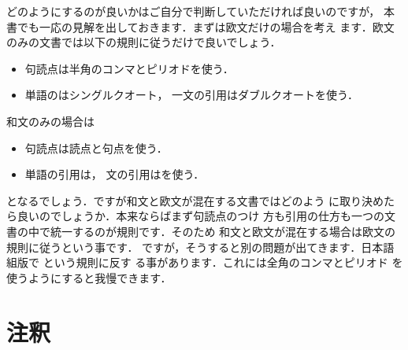 どのようにするのが良いかはご自分で判断していただければ良いのですが，
本書でも一応の見解を出しておきます．まずは欧文だけの場合を考え
ます．欧文のみの文書では以下の規則に従うだけで良いでしょう．
\begin{itemize}
 \item 句読点は半角のコンマ\yo{\str,}とピリオドを使う．
 \item 単語のはシングルクオート，
   一文の引用はダブルクオートを使う．
\end{itemize}
和文のみの場合は
\begin{itemize}
 \item 句読点は読点と句点を使う．
 \item 単語の引用は，
   文の引用はを使う．
\end{itemize}
となるでしょう．ですが和文と欧文が混在する文書ではどのよう
に取り決めたら良いのでしょうか．本来ならばまず句読点のつけ
方も引用の仕方も一つの文書の中で統一するのが規則です．そのため
和文と欧文が混在する場合は欧文の規則に従うという事です．
%
ですが，そうすると別の問題が出てきます．日本語組版で
という規則に反す
る事があります．これには全角のコンマとピリオド
を使うようにすると我慢できます．



\section{注釈}

